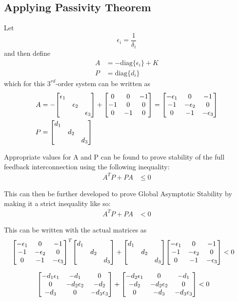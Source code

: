 \documentclass[letter]{article}
\numberwithin{equation}{section}
\begin{document}
\newpage
\subsection{Applying Passivity Theorem}
Let $$\epsilon_i = \frac{1}{\delta_i}$$ and then define
\begin{align}
	A &= - \text{diag}\{\epsilon_i\} + K\\
	P &= \text{diag}\{d_i\}
\end{align}
which for this $3^{rd}$-order system can be written as
\begin{align}
	A &= -\mqty[\dmat{\epsilon_1}{\epsilon_2}{\epsilon_3}] + \mqty[0 & 0 &-1\\ -1 & 0 & 0\\ 0 &-1 & 0] 
	= \mqty[-\epsilon_1 & 0 &-1\\
	-1 &-\epsilon_2 &0\\
	0	&-1	&-\epsilon_3]\\
	P &= \mqty[\dmat{d_1}{d_2}{d_3}]
\end{align}

Appropriate values for A and P can be found to prove stability of the full feedback interconnection using the following inequality:
\begin{align}
	A^T P + P A &\leq 0
\end{align}

This can then be further developed to prove Global Asymptotic Stability by making it a strict inequality like so:
\begin{align}
	A^T P + P A &< 0
\end{align}

This can be written with the actual matrices as
\begin{align}
	\mqty[-\epsilon_1 & 0 &-1\\
	-1 &-\epsilon_2 &0\\
	0	&-1	&-\epsilon_3]^T
	\mqty[\dmat{d_1}{d_2}{d_3}] +
	\mqty[\dmat{d_1}{d_2}{d_3}]
	\mqty[-\epsilon_1 & 0 &-1\\
	-1 &-\epsilon_2 &0\\
	0	&-1	&-\epsilon_3]
	&< 0
\end{align}

\begin{align}
	\mqty[-d_1\epsilon_1 & -d_1 &0\\
	0 &-d_2\epsilon_2 &-d_2\\
	-d_3	&0	&-d_3\epsilon_3]+
	\mqty[-d_2\epsilon_1 & 0 &-d_1\\
	-d_2 &-d_2\epsilon_2 &0\\
	0	&-d_3	&-d_3\epsilon_3]
	&< 0
\end{align}
\end{document}

